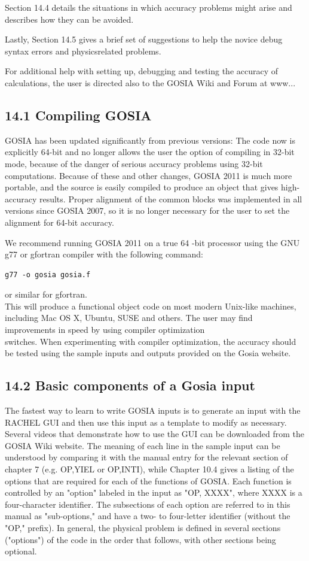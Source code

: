 \documentclass[10pt]{article}
\begin{document}
Section 14.4 details the situations in which accuracy problems might arise and describes how they can be avoided.

Lastly, Section 14.5 gives a brief set of suggestions to help the novice debug syntax errors and physicsrelated problems.

For additional help with setting up, debugging and testing the accuracy of calculations, the user is directed also to the GOSIA Wiki and Forum at www...

\subsection*{14.1 Compiling GOSIA}
GOSIA has been updated significantly from previous versions: The code now is explicitly 64-bit and no longer allows the user the option of compiling in 32-bit mode, because of the danger of serious accuracy problems using 32-bit computations. Because of these and other changes, GOSIA 2011 is much more portable, and the source is easily compiled to produce an object that gives high-accuracy results. Proper alignment of the common blocks was implemented in all versions since GOSIA 2007, so it is no longer necessary for the user to set the alignment for 64-bit accuracy.

We recommend running GOSIA 2011 on a true 64 -bit processor using the GNU g77 or gfortran compiler with the following command:

\begin{verbatim}
g77 -o gosia gosia.f
\end{verbatim}

or similar for gfortran.\\
This will produce a functional object code on most modern Unix-like machines, including Mac OS X, Ubuntu, SUSE and others. The user may find improvements in speed by using compiler optimization\\
switches. When experimenting with compiler optimization, the accuracy should be tested using the sample inputs and outputs provided on the Gosia website.

\subsection*{14.2 Basic components of a Gosia input}
The fastest way to learn to write GOSIA inputs is to generate an input with the RACHEL GUI and then use this input as a template to modify as necessary. Several videos that demonstrate how to use the GUI can be downloaded from the GOSIA Wiki website. The meaning of each line in the sample input can be understood by comparing it with the manual entry for the relevant section of chapter 7 (e.g. OP,YIEL or OP,INTI), while Chapter 10.4 gives a listing of the options that are required for each of the functions of GOSIA. Each function is controlled by an "option" labeled in the input as "OP, XXXX", where XXXX is a four-character identifier. The subsections of each option are referred to in this manual as "sub-options," and have a two- to four-letter identifier (without the "OP," prefix). In general, the physical problem is defined in several sections ("options") of the code in the order that follows, with other sections being optional.
\end{document}
